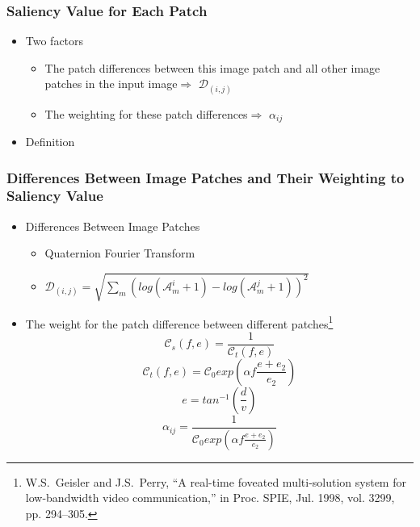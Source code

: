 \documentclass[notheorems,serif,table,compress]{beamer}  %
\begin{document}
\begin{frame}
\frametitle{Saliency Value for Each Patch}
\begin{itemize} 
\item Two factors
\begin{itemize} 
\item The patch differences between this image patch and all other image patches in the input image$\Longrightarrow$ {\color{blue}$\mathcal{D}_{(i,j)}$}
\item  The weighting for these patch differences$\Longrightarrow$ {\color{blue}$\alpha_{ij}$}
\end{itemize}
\item Definition
\begin{itemize} 
\end{itemize}
\end{itemize}

\end{frame}

\begin{frame}
\frametitle{Differences Between Image Patches and Their Weighting to Saliency Value}
\begin{itemize} 
\item Differences Between Image Patches
\begin{itemize} 
\item Quaternion Fourier Transform
\item $\mathcal{D}_{(i,j)}=\sqrt{\sum_{m}(log(\mathcal{A}_{m}^{i}+1)-log(\mathcal{A}_{m}^{j}+1))^{2}}$
\end{itemize}
\item The weight for the patch difference between different patches\footnote{W.S.~Geisler and J.S.~Perry, “A real-time foveated multi-solution system for low-bandwidth video communication,” in Proc. SPIE, Jul. 1998, vol. 3299, pp. 294–305.} 
\begin{equation}
\mathcal{C}_{s}(f,e)=\frac{1}{\mathcal{C}_{t}(f,e)}
\end{equation}
\begin{equation}
\mathcal{C}_{t}(f,e)=\mathcal{C}_{0}exp(\alpha f\frac{e+e_{2}}{e_{2}})
\end{equation}
\begin{equation}
e=tan^{-1}(\frac{d}{v})
\end{equation}
\begin{equation}
\alpha_{ij}=\frac{1}{\mathcal{C}_{0}exp(\alpha f\frac{e+e_{2}}{e_{2}})}
\end{equation}
\end{itemize}

\end{frame}
\end{document}
